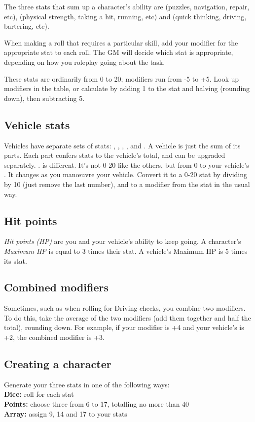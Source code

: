 \documentclass[10pt, a4paper, twocolumn]{article}
\begin{document}
The three stats that sum up a character's ability are  (puzzles,
navigation, repair,  etc),  (physical strength, taking a hit,
running, etc) and  (quick thinking, driving, bartering, etc).

When making a roll that requires a particular skill, add your modifier for the
appropriate stat to each roll. The GM will decide which stat is appropriate,
depending on how you roleplay going about the task.

These stats are ordinarily from 0 to 20; modifiers run from -5 to +5. Look up
modifiers in the table, or calculate by adding 1 to the stat and halving
(rounding down), then subtracting 5.

\subsection{Vehicle stats}
Vehicles have separate sets of stats: , ,
, ,  and . A vehicle
is just the sum of its parts. Each part confers stats to the vehicle's total,
and can be upgraded separately.
.
 is different. It's not 0-20 like the others, but from 0 to your
vehicle's . It changes as you man\oe{}uvre your vehicle.
Convert it to a 0-20 stat by dividing by 10 (just remove the last number), and
to a modifier from the stat in the usual way.

\subsection{Hit points}
\emph{Hit points (HP)} are you and your vehicle's ability to keep going. A
character's \emph{Maximum HP} is equal to 3 times their  stat. A
vehicle's Maximum HP is 5 times its  stat.

\subsection{Combined modifiers}
Sometimes, such as when rolling for Driving checks, you combine two
modifiers. To do this, take the average of the two modifiers (add them
together and half the total), rounding down. For example, if your 
modifier is +4 and your vehicle's  is +2, the combined modifier
is +3.

\subsection{Creating a character}
Generate your three stats in one of the following ways:\\
\textbf{Dice:} roll  for each stat\\
\textbf{Points:} choose three from 6 to 17, totalling no more than 40\\
\textbf{Array:} assign 9, 14 and 17 to your stats
\end{document}
